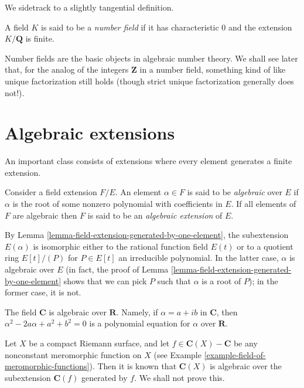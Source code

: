 \noindent
We sidetrack to a slightly tangential definition.

\begin{definition}
\label{definition-number-field}
A field $K$ is said to be a {\it number field} if it has characteristic
$0$ and the extension $K/\mathbf{Q}$ is finite.
\end{definition}

\noindent
Number fields are the basic objects in algebraic number theory. We shall see
later that,
for the analog of the integers $\mathbf{Z}$ in a number field, something kind
of like unique factorization still holds (though strict unique factorization
generally does not!).


\section{Algebraic extensions}
\label{section-algebraic-extensions}

\noindent
An important class consists of extensions where every element generates
a finite extension.

\begin{definition}
\label{definition-algebraic}
Consider a field extension $F/E$. An element $\alpha \in F$ is said to be
{\it algebraic} over $E$ if $\alpha$ is the root of some nonzero polynomial
with coefficients in $E$. If all elements of $F$ are algebraic then $F$ is
said to be an {\it algebraic extension} of $E$.
\end{definition}

\noindent
By Lemma \ref{lemma-field-extension-generated-by-one-element}, the
subextension $E(\alpha)$ is isomorphic either to the rational function
field $E(t)$ or to a quotient ring $E[t]/(P)$ for $P \in E[t]$ an
irreducible polynomial. In the latter case, $\alpha$ is algebraic over
$E$ (in fact, the proof of
Lemma \ref{lemma-field-extension-generated-by-one-element}
shows that we can pick $P$ such that $\alpha$ is a root of $P$);
in the former case, it is not.

\begin{example}
\label{example-C-algebraic-over-R}
The field $\mathbf{C}$ is algebraic over $\mathbf{R}$. Namely, if
$\alpha = a + ib$ in $\mathbf{C}$, then $\alpha^2 - 2a\alpha + a^2 + b^2 = 0$
is a polynomial equation for $\alpha$ over $\mathbf{R}$.
\end{example}

\begin{example}
\label{example-compact-riemann-surface-is-finite-over-P1}
Let $X$ be a compact Riemann surface, and let
$f \in \mathbf{C}(X) - \mathbf{C}$ be any nonconstant meromorphic function
on $X$ (see Example \ref{example-field-of-meromorphic-functions}). Then it is
known that $\mathbf{C}(X)$ is algebraic over the subextension
$\mathbf{C}(f)$ generated by $f$. We shall not prove this.
\end{example}

